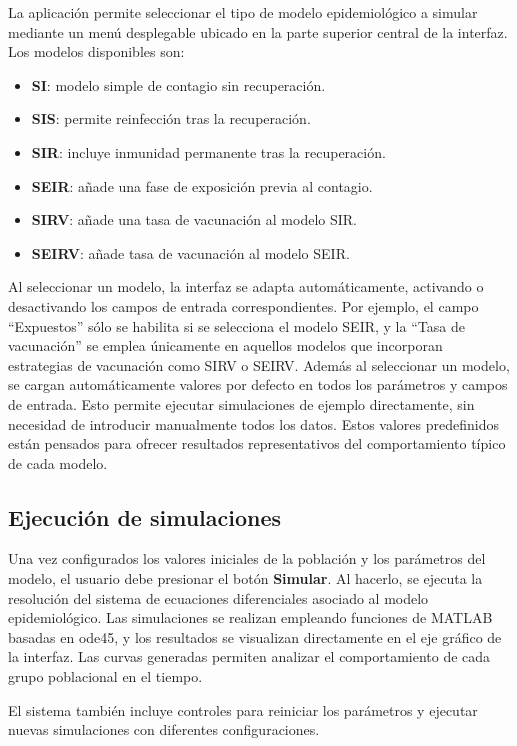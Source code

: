 La aplicación permite seleccionar el tipo de modelo epidemiológico a simular mediante un menú desplegable ubicado en la parte superior central de la interfaz. Los modelos disponibles son:

\begin{itemize}
    \item \textbf{SI}: modelo simple de contagio sin recuperación.
    \item \textbf{SIS}: permite reinfección tras la recuperación.
    \item \textbf{SIR}: incluye inmunidad permanente tras la recuperación.
    \item \textbf{SEIR}: añade una fase de exposición previa al contagio.
    \item \textbf{SIRV}: añade una tasa de vacunación al modelo SIR.
    \item \textbf{SEIRV}: añade tasa de vacunación al modelo SEIR.
\end{itemize}

Al seleccionar un modelo, la interfaz se adapta automáticamente, activando o desactivando los campos de entrada correspondientes. Por ejemplo, el campo “Expuestos” sólo se habilita si se selecciona el modelo SEIR, y la “Tasa de vacunación” se emplea únicamente en aquellos modelos que incorporan estrategias de vacunación como SIRV o SEIRV. Además al seleccionar un modelo, se cargan automáticamente valores por defecto en todos los parámetros y campos de entrada. Esto permite ejecutar simulaciones de ejemplo directamente, sin necesidad de introducir manualmente todos los datos. Estos valores predefinidos están pensados para ofrecer resultados representativos del comportamiento típico de cada modelo.


\subsection{Ejecución de simulaciones}

Una vez configurados los valores iniciales de la población y los parámetros del modelo, el usuario debe presionar el botón \textbf{Simular}. Al hacerlo, se ejecuta la resolución del sistema de ecuaciones diferenciales asociado al modelo epidemiológico. Las simulaciones se realizan empleando funciones de MATLAB basadas en ode45, y los resultados se visualizan directamente en el eje gráfico de la interfaz. Las curvas generadas permiten analizar el comportamiento de cada grupo poblacional en el tiempo.

El sistema también incluye controles para reiniciar los parámetros y ejecutar nuevas simulaciones con diferentes configuraciones.

